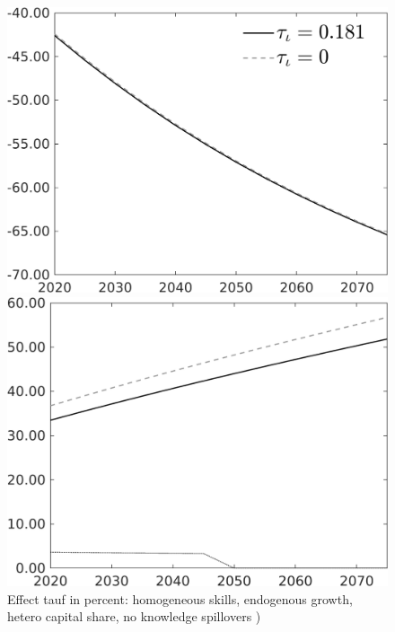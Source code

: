 \documentclass[12pt]{article}
\begin{document}
\begin{figure}[h!!]
	\centering
	\caption{Effect tauf in percent: homogeneous skills, endogenous growth, hetero capital share, no knowledge spillovers )}\label{fig:Leveltauf_nsk1_xgr0_noknow_notaul}
	\begin{minipage}[]{0.32\textwidth}
		\includegraphics[width=1\textwidth]{../../codding_model/own_basedOnFried/optimalPol_010922_revision/figures/all_13Sept22/PerdifNoTauf_regime0_CompTaul_Emnet_spillover0_nsk1_xgr0_knspil1_sep1_LFlimit0_emsbase0_countec0_GovRev0_etaa0.79_lgd1.png}
	\end{minipage}	
	\begin{minipage}[]{0.32\textwidth}
		\includegraphics[width=1\textwidth]{../../codding_model/own_basedOnFried/optimalPol_010922_revision/figures/all_13Sept22/CompTauf_bytaul_Reg0_Emnet_spillover0_nsk1_xgr0_knspil1_sep1_LFlimit0_emsbase0_countec0_GovRev0_etaa0.79_lgd0.png}

\end{minipage}
\end{figure}
\end{document}
